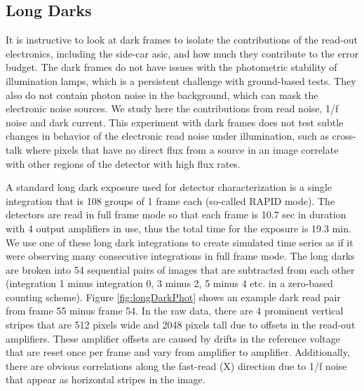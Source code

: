 \documentclass{aastex62}
\begin{document}
\clearpage
\subsection{Long Darks}\label{sec:longDarks}

It is instructive to look at dark frames to isolate the contributions of the read-out electronics, including the side-car asic, and how much they contribute to the error budget.
The dark frames do not have issues with the photometric stability of illumination lamps, which is a persistent challenge with ground-based tests.
They also do not contain photon noise in the background, which can mask the electronic noise sources.
We study here the contributions from read noise, 1/f noise and dark current.
This experiment with dark frames does not test subtle changes in behavior of the electronic read noise under illumination, such as cross-talk where pixels that have no direct flux from a source in an image correlate with other regions of the detector with high flux rates.

A standard long dark exposure used for detector characterization is a single integration that is 108 groups of 1 frame each (so-called RAPID mode).
The detectors are read in full frame mode so that each frame is 10.7 sec in duration with 4 output amplifiers in use, thus the total time for the exposure is 19.3 min.
We use one of these long dark integrations to create simulated time series as if it were observing many consecutive integrations in full frame mode.
The long darks are broken into 54 sequential pairs of images that are subtracted from each other (integration 1 minus integration 0, 3 minus 2, 5 minus 4 etc. in a zero-based counting scheme).
Figure \ref{fig:longDarkPhot} shows an example dark read pair from frame 55 minus frame 54.
In the raw data, there are 4 prominent vertical stripes that are 512 pixels wide and 2048 pixels tall due to offsets in the read-out amplifiers.
These amplifier offsets are caused by drifts in the reference voltage that are reset once per frame and vary from amplifier to amplifier.
Additionally, there are obvious correlations along the fast-read (X) direction due to 1/f noise that appear as horizontal stripes in the image.
\end{document}
